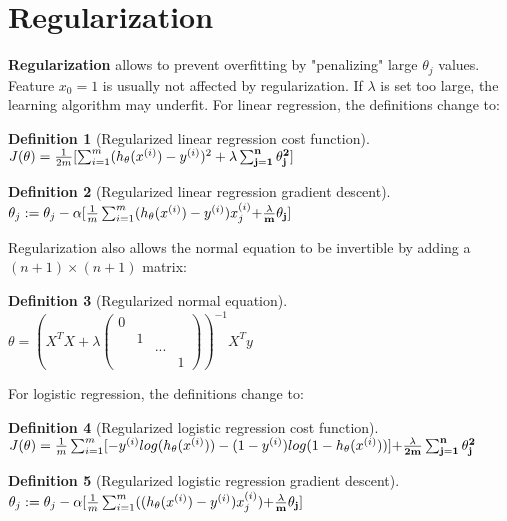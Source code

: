 \documentclass{report}
\newtheorem{definition}{Definition}[section]
\begin{document}
\section{Regularization}
{\bf Regularization} allows to prevent overfitting by "penalizing" large $\theta_j$ values. Feature $x_0=1$ is usually not affected by regularization. If $\lambda$ is set too large, the learning algorithm may underfit. For linear regression, the definitions change to:

\begin{definition}[Regularized linear regression cost function] ~\\
$J(\theta) = \frac{1}{2m}[\sum_{i=1}^m(h_\theta(x^{(i)})-y^{(i)})^2+ {\bf \lambda \sum_{j=1}^n\theta_j^2}]$
\end{definition}

\begin{definition}[Regularized linear regression gradient descent] ~\\
$\theta_j := \theta_j - \alpha[ \frac{1}{m}\sum_{i=1}^m(h_\theta(x^{(i)})-y^{(i)})x_j^{(i)} {\bf +\frac{\lambda}{m}\theta_j}]$
\end{definition}

Regularization also allows the normal equation to be invertible by adding a $(n+1)\times (n+1)$ matrix:
\begin{definition}[Regularized normal equation] ~\\
$\theta = (X^{T}X+\lambda
\begin{pmatrix}
0 & & & \\
&1& &\\
& & ... & \\
& & & 1
\end{pmatrix}
)^{-1}X^{T}y$
\end{definition}

For logistic regression, the definitions change to:

\begin{definition}[Regularized logistic regression cost function] ~\\
$J(\theta) = \frac{1}{m}\sum_{i=1}^m[-y^{(i)}log(h_{\theta}(x^{(i)}))-(1-y^{(i)})log(1-h_{\theta}(x^{(i)}))] {\bf + \frac{\lambda}{2m}\sum_{j=1}^n\theta_j^2}$
\end{definition}

\begin{definition}[Regularized logistic regression gradient descent] ~\\
$\theta_j := \theta_j - \alpha[ \frac{1}{m}\sum_{i=1}^m((h_\theta(x^{(i)})-y^{(i)})x_j^{(i)} ) {\bf + \frac{\lambda}{m}\theta_j}]$
\end{definition}
\end{document}
